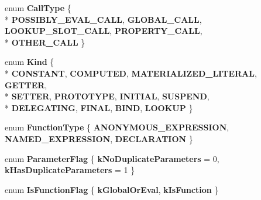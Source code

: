 \begin{DoxyCompactItemize}
\item 
\hypertarget{classv8_1_1internal_1_1_v8___f_i_n_a_l_a96e4df2c2d31874c7ba14c2a99823dca}{}enum {\bfseries Call\+Type} \{ \\*
{\bfseries P\+O\+S\+S\+I\+B\+L\+Y\+\_\+\+E\+V\+A\+L\+\_\+\+C\+A\+L\+L}, 
{\bfseries G\+L\+O\+B\+A\+L\+\_\+\+C\+A\+L\+L}, 
{\bfseries L\+O\+O\+K\+U\+P\+\_\+\+S\+L\+O\+T\+\_\+\+C\+A\+L\+L}, 
{\bfseries P\+R\+O\+P\+E\+R\+T\+Y\+\_\+\+C\+A\+L\+L}, 
\\*
{\bfseries O\+T\+H\+E\+R\+\_\+\+C\+A\+L\+L}
 \}\label{classv8_1_1internal_1_1_v8___f_i_n_a_l_a96e4df2c2d31874c7ba14c2a99823dca}

\item 
\hypertarget{classv8_1_1internal_1_1_v8___f_i_n_a_l_ab798cb8a78cc1c893470afbceaf1e960}{}enum {\bfseries Kind} \{ \\*
{\bfseries C\+O\+N\+S\+T\+A\+N\+T}, 
{\bfseries C\+O\+M\+P\+U\+T\+E\+D}, 
{\bfseries M\+A\+T\+E\+R\+I\+A\+L\+I\+Z\+E\+D\+\_\+\+L\+I\+T\+E\+R\+A\+L}, 
{\bfseries G\+E\+T\+T\+E\+R}, 
\\*
{\bfseries S\+E\+T\+T\+E\+R}, 
{\bfseries P\+R\+O\+T\+O\+T\+Y\+P\+E}, 
{\bfseries I\+N\+I\+T\+I\+A\+L}, 
{\bfseries S\+U\+S\+P\+E\+N\+D}, 
\\*
{\bfseries D\+E\+L\+E\+G\+A\+T\+I\+N\+G}, 
{\bfseries F\+I\+N\+A\+L}, 
{\bfseries B\+I\+N\+D}, 
{\bfseries L\+O\+O\+K\+U\+P}
 \}\label{classv8_1_1internal_1_1_v8___f_i_n_a_l_ab798cb8a78cc1c893470afbceaf1e960}

\item 
\hypertarget{classv8_1_1internal_1_1_v8___f_i_n_a_l_aae4c74f51136b58a452f011e3eb4ebe6}{}enum {\bfseries Function\+Type} \{ {\bfseries A\+N\+O\+N\+Y\+M\+O\+U\+S\+\_\+\+E\+X\+P\+R\+E\+S\+S\+I\+O\+N}, 
{\bfseries N\+A\+M\+E\+D\+\_\+\+E\+X\+P\+R\+E\+S\+S\+I\+O\+N}, 
{\bfseries D\+E\+C\+L\+A\+R\+A\+T\+I\+O\+N}
 \}\label{classv8_1_1internal_1_1_v8___f_i_n_a_l_aae4c74f51136b58a452f011e3eb4ebe6}

\item 
\hypertarget{classv8_1_1internal_1_1_v8___f_i_n_a_l_a8bf596c1fc64c7e9c11e1b015a83c551}{}enum {\bfseries Parameter\+Flag} \{ {\bfseries k\+No\+Duplicate\+Parameters} = 0, 
{\bfseries k\+Has\+Duplicate\+Parameters} = 1
 \}\label{classv8_1_1internal_1_1_v8___f_i_n_a_l_a8bf596c1fc64c7e9c11e1b015a83c551}

\item 
\hypertarget{classv8_1_1internal_1_1_v8___f_i_n_a_l_aa2be8fbe7aef11fa0f76877e600fd93b}{}enum {\bfseries Is\+Function\+Flag} \{ {\bfseries k\+Global\+Or\+Eval}, 
{\bfseries k\+Is\+Function}
 \}\label{classv8_1_1internal_1_1_v8___f_i_n_a_l_aa2be8fbe7aef11fa0f76877e600fd93b}


\end{DoxyCompactItemize}
